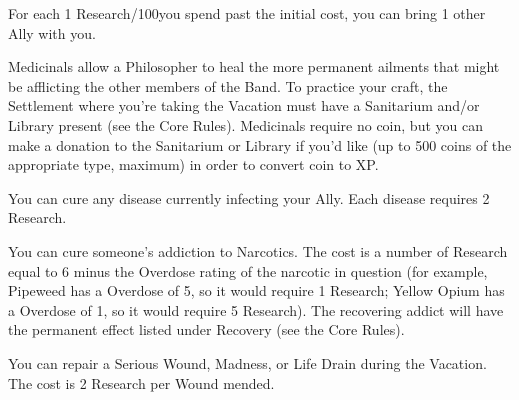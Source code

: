 {For each 1 Research/100\AU you spend past the initial cost, you can bring 1 other Ally with you.

\newpage


Medicinals allow a Philosopher to heal the more permanent ailments that might be afflicting the other members of the Band.   To practice your craft, the Settlement where you're taking the Vacation must have a Sanitarium and/or Library present (see the Core Rules).  Medicinals require no coin, but you can make a donation to the Sanitarium or Library if you'd like (up to 500 coins of the appropriate type, maximum) in order to convert coin to XP.



You can cure any disease currently infecting your Ally.  Each disease requires 2 Research.




You can cure someone's addiction to Narcotics.  The cost is a number of Research equal to 6 minus the \MAX Overdose rating of the narcotic in question (for example, Pipeweed has a \MAX Overdose of 5, so it would require 1 Research; Yellow Opium has a \MAX Overdose of 1, so it would require 5 Research).  The recovering addict will have the permanent effect listed under Recovery (see the Core Rules).




You can repair a Serious Wound, Madness, or Life Drain during the Vacation.  The cost is 2 Research per Wound mended.




}%
